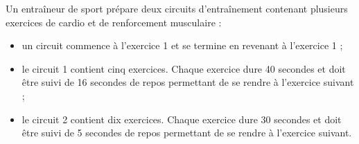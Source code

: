 \documentclass[a4paper,11pt]{article}
\begin{document}
Un entraîneur de sport prépare deux circuits d'entraînement contenant plusieurs exercices de cardio et de renforcement musculaire :

\begin{itemize}[label=\textbullet, itemsep=2pt]
  \item un circuit commence à l'exercice 1 et se termine en revenant à l'exercice 1 ;
  \item le circuit 1 contient cinq exercices. Chaque exercice dure 40 secondes et doit être suivi de 16 secondes de repos permettant de se rendre à l'exercice suivant ;
  \item le circuit 2 contient dix exercices. Chaque exercice dure 30 secondes et doit être suivi de 5 secondes de repos permettant de se rendre à l'exercice suivant.
\end{itemize}

\begin{center}
\hfill
{}
\end{center}
\end{document}
